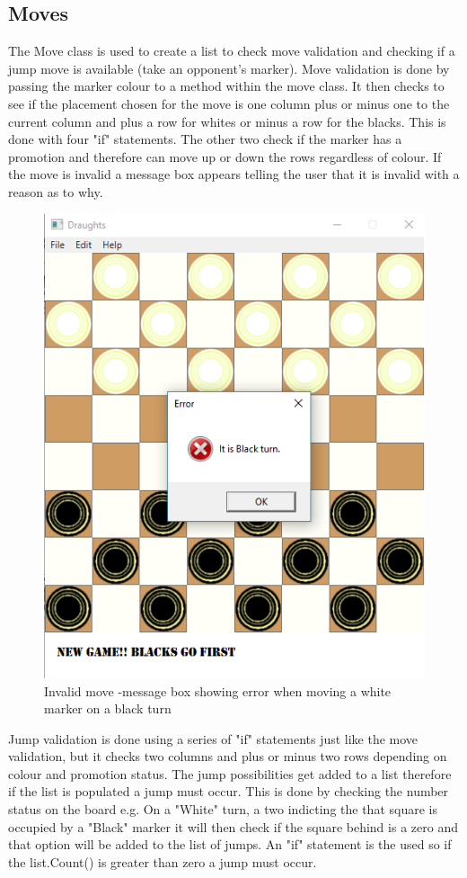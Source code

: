 \documentclass[10pt, a4paper]{article}
\begin{document}
	\subsection{Moves}
The Move class is used to create a list to check move validation and checking if a jump move is available (take an opponent's marker). Move validation is done by passing the marker colour to a method within the move class. It then checks to see if the placement chosen for the move is one column plus or minus one to the current column and plus a row for whites or minus a row for the blacks. This is done with four "if" statements. The other two check if the marker has a promotion and therefore can move up or down the rows regardless of colour. If the move is invalid a message box appears telling the user that it is invalid with a reason as to why.
	\begin{figure}[H]
  	\centering
  	\includegraphics[scale = 0.5]{errors}
	\caption{Invalid move -message box showing error when moving a white marker on a black turn}
  	\label{fig:nonfloat}
	\end{figure}
	
	
Jump validation is done using a series of "if" statements just like the move validation, but it checks two columns and plus or minus two rows depending on colour and promotion status. The jump possibilities get added to a list therefore if the list is populated a jump must occur. 
This is done by checking the number status on the board e.g. On a "White" turn, a two indicting the that square is occupied by a "Black" marker it will then check if the square behind is a zero and that option will be added to the list of jumps. An "if" statement is the used so if the list.Count() is greater than zero a jump must occur. 
  
\end{document}
